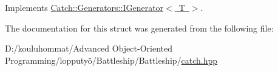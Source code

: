 Implements \mbox{\hyperlink{struct_catch_1_1_generators_1_1_i_generator_a737a89eb0bff02e580e36c59fb0d1171}{Catch\+::\+Generators\+::\+I\+Generator$<$ T $>$}}.



The documentation for this struct was generated from the following file\+:\begin{DoxyCompactItemize}
\item 
D\+:/kouluhommat/\+Advanced Object-\/\+Oriented Programming/lopputyö/\+Battleship/\+Battleship/\mbox{\hyperlink{catch_8hpp}{catch.\+hpp}}\end{DoxyCompactItemize}
